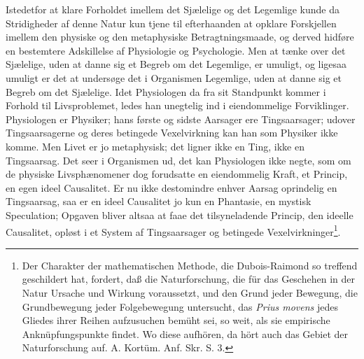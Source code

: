 \documentclass[12pt,a4paper]{book}
\begin{document}
Istedetfor at klare Forholdet imellem det Sjælelige og det Legemlige
kunde da Stridigheder af denne Natur kun tjene til efterhaanden at
opklare Forskjellen imellem den physiske og den metaphysiske
Betragtningsmaade, og derved hidføre en bestemtere Adskillelse af
Physiologie og Psychologie. Men at tænke over det Sjælelige, uden at
danne sig et Begreb om det Legemlige, er umuligt, og ligesaa umuligt
er det at undersøge det i Organismen Legemlige, uden at danne sig et
Begreb om det Sjælelige. Idet Physiologen da fra sit Standpunkt
kommer i Forhold til Livsproblemet, ledes han unegtelig ind i
eiendommelige Forviklinger. Physiologen er Physiker; hans første og
sidste Aarsager ere Tingsaarsager; udover Tingsaarsagerne og deres
betingede Vexelvirkning kan han som Physiker ikke komme. Men Livet
er jo metaphysisk; det ligner ikke en Ting, ikke en Tingsaarsag. Det
seer i Organismen ud, det kan Physiologen ikke negte, som om de
physiske Livsphænomener dog forudsatte en eiendommelig Kraft, et
Princip, en egen ideel Causalitet. Er
nu ikke destomindre enhver Aarsag oprindelig en Tingsaarsag, saa er
en ideel Causalitet jo kun en Phantasie, en mystisk Speculation;
Opgaven bliver altsaa at faae det tilsyneladende Princip, den
ideelle Causalitet, opløst i et System af Tingsaarsager og betingede
Vexelvirkninger\footnote{Der Charakter der mathematischen Methode,
die Dubois-Raimond so treffend geschildert hat, fordert, daß die
Naturforschung, die für das Geschehen in der Natur Ursache und
Wirkung voraussetzt, und den Grund jeder Bewegung, die
Grundbewegung jeder Folgebewegung untersucht, das \textit{Prius
movens} jedes Gliedes ihrer Reihen aufzusuchen bemüht sei, so weit,
als sie empirische Anknüpfungspunkte findet. Wo diese aufhören, da
hört auch das Gebiet der Naturforschung auf. A. Kortüm. Anf. Skr.
S. 3.}.
\end{document}
